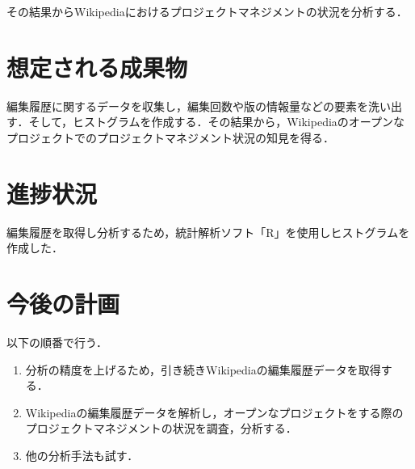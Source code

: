 \documentclass[uplatex,twocolumn,dvipdfmx]{jsarticle}
\begin{document}
その結果からWikipediaにおけるプロジェクトマネジメントの状況を分析する．

\section{想定される成果物}

編集履歴に関するデータを収集し，編集回数や版の情報量などの要素を洗い出す．そして，ヒストグラムを作成する．その結果から，Wikipediaのオープンなプロジェクトでのプロジェクトマネジメント状況の知見を得る．

\section{進捗状況}

編集履歴を取得し分析するため，統計解析ソフト「R」を使用しヒストグラムを作成した．


\section{今後の計画}

以下の順番で行う．

\begin{enumerate}

 \item 分析の精度を上げるため，引き続きWikipediaの編集履歴データを取得する．
 \item Wikipediaの編集履歴データを解析し，オープンなプロジェクトをする際のプロジェクトマネジメントの状況を調査，分析する．
 \item 他の分析手法も試す．

\end{enumerate}



\end{document}
